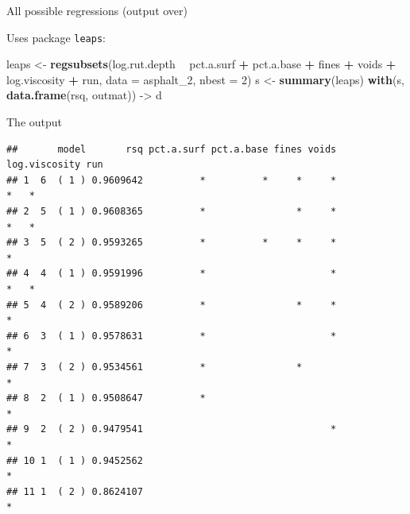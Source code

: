 \documentclass[ignorenonframetext,]{beamer}
\newenvironment{Shaded}{\begin{snugshade}}{\end{snugshade}}
\newcommand{\DataTypeTok}[1]{\textcolor[rgb]{0.13,0.29,0.53}{#1}}
\newcommand{\DecValTok}[1]{\textcolor[rgb]{0.00,0.00,0.81}{#1}}
\newcommand{\KeywordTok}[1]{\textcolor[rgb]{0.13,0.29,0.53}{\textbf{#1}}}
\newcommand{\NormalTok}[1]{#1}
\newcommand{\OperatorTok}[1]{\textcolor[rgb]{0.81,0.36,0.00}{\textbf{#1}}}
\newcommand{\StringTok}[1]{\textcolor[rgb]{0.31,0.60,0.02}{#1}}
\begin{document}
\begin{frame}[fragile]{All possible regressions (output over)}
\protect\hypertarget{all-possible-regressions-output-over}{}

Uses package \texttt{leaps}:

\begin{Shaded}
\begin{Highlighting}[]
\NormalTok{leaps <-}\StringTok{ }\KeywordTok{regsubsets}\NormalTok{(log.rut.depth }\OperatorTok{~}\StringTok{ }\NormalTok{pct.a.surf }\OperatorTok{+}\StringTok{ }\NormalTok{pct.a.base }\OperatorTok{+}\StringTok{ }\NormalTok{fines }\OperatorTok{+}\StringTok{ }\NormalTok{voids }\OperatorTok{+}
\StringTok{  }\NormalTok{log.viscosity }\OperatorTok{+}\StringTok{ }\NormalTok{run, }\DataTypeTok{data =}\NormalTok{ asphalt_}\DecValTok{2}\NormalTok{, }\DataTypeTok{nbest =} \DecValTok{2}\NormalTok{)}
\NormalTok{s <-}\StringTok{ }\KeywordTok{summary}\NormalTok{(leaps)}
\KeywordTok{with}\NormalTok{(s, }\KeywordTok{data.frame}\NormalTok{(rsq, outmat)) ->}\StringTok{ }\NormalTok{d}
\end{Highlighting}
\end{Shaded}

\end{frame}

\begin{frame}[fragile]{The output}
\protect\hypertarget{the-output}{}

\scriptsize

\begin{Shaded}
\end{Shaded}

\begin{verbatim}
##       model       rsq pct.a.surf pct.a.base fines voids log.viscosity run
## 1  6  ( 1 ) 0.9609642          *          *     *     *             *   *
## 2  5  ( 1 ) 0.9608365          *                *     *             *   *
## 3  5  ( 2 ) 0.9593265          *          *     *     *             *    
## 4  4  ( 1 ) 0.9591996          *                      *             *   *
## 5  4  ( 2 ) 0.9589206          *                *     *             *    
## 6  3  ( 1 ) 0.9578631          *                      *             *    
## 7  3  ( 2 ) 0.9534561          *                *                   *    
## 8  2  ( 1 ) 0.9508647          *                                    *    
## 9  2  ( 2 ) 0.9479541                                 *             *    
## 10 1  ( 1 ) 0.9452562                                               *    
## 11 1  ( 2 ) 0.8624107                                                   *
\end{verbatim}

\normalsize

\end{frame}
\end{document}
